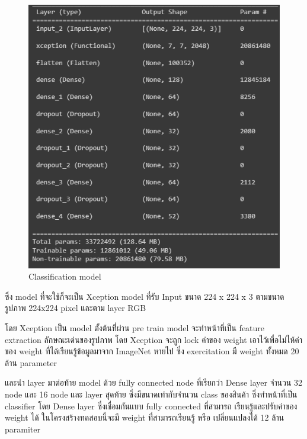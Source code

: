 \begin{figure}[h]
  \begin{center}

    \includegraphics[scale=0.6]{pic/model/model.png}

  \end{center}

  \caption[Classification model]{Classification model}
  \label{fig:Classification model}
\end{figure}

 

ซึ่ง model ที่จะใช้ก็จะเป็น Xception model ที่รับ Input ขนาด 224 x 224 x 3 ตามขนาดรูปภาพ 224x224 pixel และตาม layer RGB

โดย Xception เป็น model ตั้งต้นที่่ผ่าน pre train model จะทำหน้าที่เป็น feature extraction  ลักษณะเด่นของรูปภาพ
โดย Xception จะถูก lock ค่าของ weight เอาไว้เพื่อไม่ไห้ค่าของ weight ที่ได้เรียนรู้ข้อมูลมาจาก ImageNet หายไป
ซึ่ง exercitation มี weight ทั้งหมด 20 ล้าน parameter

และนำ layer มาต่อท้าย model ด้วย fully connected node ที่เรียกว่า Dense layer จำนวน 32 node และ 16 node และ
layer สุดท้าย ซึ่งมีขนาดเท่ากับจำนวน class ของสินค้า ซึ่งทำหน้าที่เป็น classifier
โดย Dense layer ซึ่งเชื่อมกันแบบ fully connected ที่สามารถ เรียนรู้และปรับค่าของ weight ได้
ในโครงสร้างทดสอบนี้จะมี weight ที่่สามารถเรียนรู้ หรือ เปลี่ยนแปลงได้ 12 ล้าน paramiter


